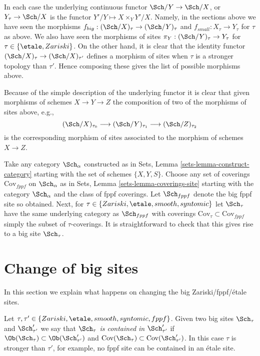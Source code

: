In each case the underlying continuous functor
$\Sch/Y \to \Sch/X$, or
$Y_\tau \to \Sch/X$
is the functor $Y'/Y \mapsto X \times_Y Y'/X$. Namely, in the sections
above we have seen the morphisms
$f_{big} : (\Sch/X)_\tau \to (\Sch/Y)_\tau$
and
$f_{small} : X_\tau \to Y_\tau$
for $\tau$ as above.
We also have seen the morphisms of sites
$\pi_Y : (\Sch/Y)_\tau \to Y_\tau$ for
$\tau \in \{\etale, Zariski\}$.
On the other hand, it is clear that the identity functor
$(\Sch/X)_\tau \to (\Sch/X)_{\tau'}$ defines
a morphism of sites when $\tau$ is a stronger topology than
$\tau'$. Hence composing these gives the list of possible morphisms
above.

\medskip\noindent
Because of the simple description of the underlying functor it
is clear that given morphisms of schemes $X \to Y \to Z$ the
composition of two of the morphisms of sites above, e.g.,
$$
(\Sch/X)_{\tau_0} \longrightarrow
(\Sch/Y)_{\tau_1} \longrightarrow
(\Sch/Z)_{\tau_2}
$$
is the corresponding morphism of sites associated to the morphism
of schemes $X \to Z$.

\begin{remark}
\label{remark-choice-sites}
Take any category $\Sch_\alpha$ constructed as in
Sets, Lemma \ref{sets-lemma-construct-category}
starting with the set of schemes $\{X, Y, S\}$. Choose any set of
coverings $\text{Cov}_{fppf}$ on $\Sch_\alpha$ as in
Sets, Lemma \ref{sets-lemma-coverings-site}
starting with the category $\Sch_\alpha$ and the class of fppf
coverings. Let $\Sch_{fppf}$ denote the big fppf site so
obtained. Next, for $\tau \in \{Zariski, \etale, smooth, syntomic\}$
let $\Sch_\tau$ have the same underlying category as
$\Sch_{fppf}$ with coverings
$\text{Cov}_\tau \subset \text{Cov}_{fppf}$ simply the subset of
$\tau$-coverings. It is straightforward to check that this gives rise
to a big site $\Sch_\tau$.
\end{remark}









\section{Change of big sites}
\label{section-change-alpha}

\noindent
In this section we explain what happens on changing the big
Zariski/fppf/\'etale sites.

\medskip\noindent
Let $\tau, \tau' \in \{Zariski, \etale, smooth, syntomic, fppf\}$.
Given two big sites $\Sch_\tau$ and $\Sch'_{\tau'}$
we say that
{\it $\Sch_\tau$ is contained in $\Sch'_{\tau'}$} if
$\Ob(\Sch_\tau) \subset \Ob(\Sch'_{\tau'})$
and
$\text{Cov}(\Sch_\tau) \subset \text{Cov}(\Sch'_{\tau'})$.
In this case $\tau$ is stronger than $\tau'$, for example, no fppf
site can be contained in an \'etale site.

